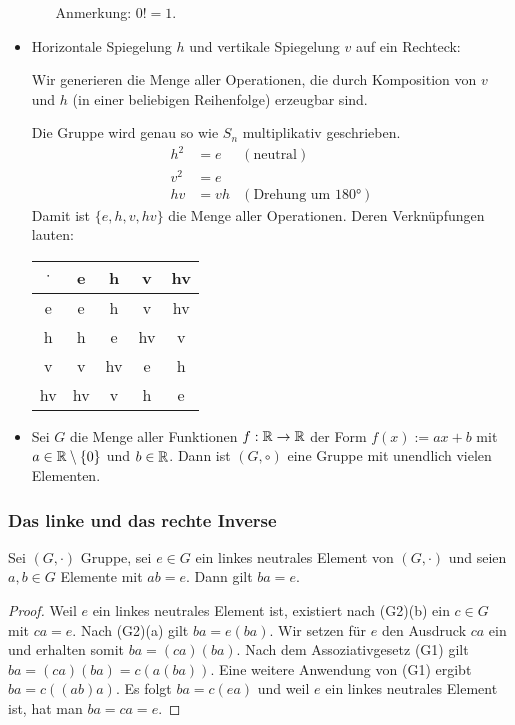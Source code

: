 \begin{bsp}
\begin{itemize}
\begin{itemize}
		Anmerkung: $ 0! = 1 $. 
	\end{itemize}
	
	\item Horizontale Spiegelung $ h $ und vertikale Spiegelung $ v $ auf ein Rechteck:
	
	Wir generieren die Menge aller Operationen, die durch Komposition von $ v $ und $ h $ (in einer beliebigen Reihenfolge) erzeugbar sind.
	
	Die Gruppe wird genau so wie $ S_n $ multiplikativ geschrieben.
	\begin{align*}
	h^2 &= e &(\text{neutral}) \\
	v^2 &= e \\
	hv &= vh &(\text{Drehung um 180°})
	\end{align*}
	Damit ist $ \{ e,h,v,hv \} $ die Menge aller Operationen. Deren Verknüpfungen lauten:
	
	\begin{center}
	\begin{tabular}{c||c|c|c|c}
		$ \cdot $ & e & h & v & hv \\
		\hline \hline
		e & e & h & v & hv \\
		h & h & e & hv & v \\
		v & v & hv & e & h \\
		hv & hv & v & h & e
	\end{tabular}
	\end{center}
	
	\item Sei $ G $ die Menge aller Funktionen $ f : \mathbb R \to \mathbb R $ der Form $ f(x) := ax + b $ mit $ a \in \mathbb R \setminus \{ 0 \} $ und $ b \in \mathbb R $. Dann ist $ (G,\circ) $ eine Gruppe mit unendlich vielen Elementen.
\end{itemize}
\end{bsp}

\subsubsection{Das linke und das rechte Inverse}


\begin{propn}
	Sei $ (G,\cdot) $ Gruppe, sei $ e \in G $ ein linkes neutrales Element von $ (G,\cdot) $ und seien $ a,b \in  G $ Elemente mit $ ab = e $. Dann gilt $ ba = e $.
\end{propn}
\begin{proof}
	Weil $ e $ ein linkes neutrales Element ist, existiert nach (G2)(b) ein $ c \in G $ mit $ ca = e $. Nach (G2)(a) gilt $ ba = e(ba) $. Wir setzen für $ e $ den Ausdruck $ ca $ ein und erhalten somit $ ba = (ca)(ba) $. Nach dem Assoziativgesetz (G1) gilt $ ba = (ca)(ba) = c(a(ba)) $. Eine weitere Anwendung von (G1) ergibt $ ba = c((ab)a) $. Es folgt $ ba = c(ea) $ und weil $ e $ ein linkes neutrales Element ist, hat man $ ba = ca = e $.
\end{proof}

